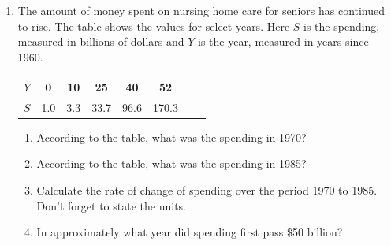\documentclass[12pt]{article}
\begin{document}
\begin{enumerate}

\item The amount of money spent on nursing home care for seniors has continued to rise.  The table shows the values for select years.  Here $S$ is the spending, measured in billions of dollars and $Y$ is the year, measured in years since 1960.

\begin{center}
\begin{tabular} {|c ||c |c |c |c |c |c |c |} \hline
$Y$ & 0 & 10 & 25 & 40 & 52 \\ \hline
$S$ & 1.0 & 3.3 & 33.7 & 96.6 & 170.3 \\ \hline
\end{tabular}
\end{center}

\begin{enumerate}
\item According to the table, what was the spending in 1970?  \vfill
\item According to the table, what was the spending in 1985?  \vfill
\item Calculate the rate of change of spending over the period 1970 to 1985.  Don't forget to state the units. \vfill \vfill
\item In approximately what year did spending first pass \$50 billion? \vfill
\end{enumerate}

\newpage


\end{enumerate}
\end{document}
